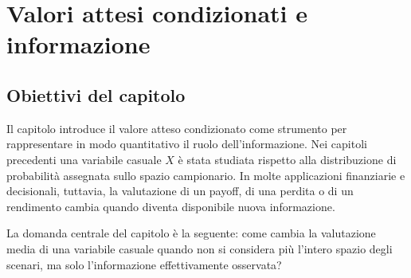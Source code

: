 


\chapter{Valori attesi condizionati e informazione}

\section{Obiettivi del capitolo}

Il capitolo introduce il valore atteso condizionato come strumento per rappresentare in modo quantitativo il ruolo dell'informazione. Nei capitoli precedenti una variabile casuale $X$ \`{e} stata studiata rispetto alla distribuzione di probabilit\`{a} assegnata sullo spazio campionario. In molte applicazioni finanziarie e decisionali, tuttavia, la valutazione di un payoff, di una perdita o di un rendimento cambia quando diventa disponibile nuova informazione.

La domanda centrale del capitolo \`{e} la seguente: come cambia la valutazione media di una variabile casuale quando non si considera pi\`{u} l'intero spazio degli scenari, ma solo l'informazione effettivamente osservata?

